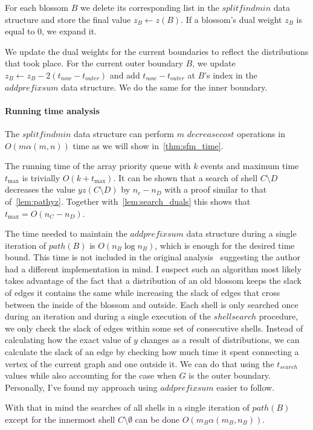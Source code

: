 For each blossom $B$ we delete its corresponding list in the $splitfindmin$ data structure and store the final value $z_B \gets z(B)$. If a blossom's dual weight $z_B$ is equal to $0$, we expand it.

We update the dual weights for the current boundaries to reflect the distributions that took place. For the current outer boundary $B$, we update $z_B \gets z_B - 2(t_{now} - t_{outer})$ and add $t_{now} - t_{outer}$ at $B$'s index in the $addprefixsum$ data structure. We do the same for the inner boundary.

\paragraph*{Running time analysis} The $splitfindmin$ data structure can perform $m$ $decreasecost$ operations in $O(m\alpha(m,n))$ time as we will show in~\ref{thm:sfm_time}.

The running time of the array priority queue with $k$ events and maximum time $t_{\max}$ is trivially $O(k + t_{\max})$. It can be shown that a search of shell $C \setminus D$ decreases the value $yz(C \setminus D)$ by $n_c - n_D$ with a proof similar to that of~\ref{lem:pathyz}. Together with~\ref{lem:search_duals} this shows that $t_{\max} = O(n_C - n_D)$. 

The time needed to maintain the $addprefixsum$ data structure during a single iteration of $path(B)$ is $O(n_B \log n_B)$, which is enough for the desired time bound. This time is not included in the original analysis~\cite{gabow1984scaling} suggesting the author had a different implementation in mind. I suspect such an algorithm most likely takes advantage of the fact that a distribution of an old blossom keeps the slack of edges it contains the same while increasing the slack of edges that cross between the inside of the blossom and outside. Each shell is only searched once during an iteration and during a single execution of the $shellsearch$ procedure, we only check the slack of edges within some set of consecutive shells. Instead of calculating how the exact value of $y$ changes as a result of distributions, we can calculate the slack of an edge by checking how much time it spent connecting a vertex of the current graph and one outside it. We can do that using the $t_{search}$ values while also accounting for the case when $G$ is the outer boundary. Personally, I've found my approach using $addprefixsum$ easier to follow.

With that in mind the searches of all shells in a single iteration of $path(B)$ except for the innermost shell $C \setminus \emptyset$ can be done $O(m_B \alpha(m_B, n_B))$. 

